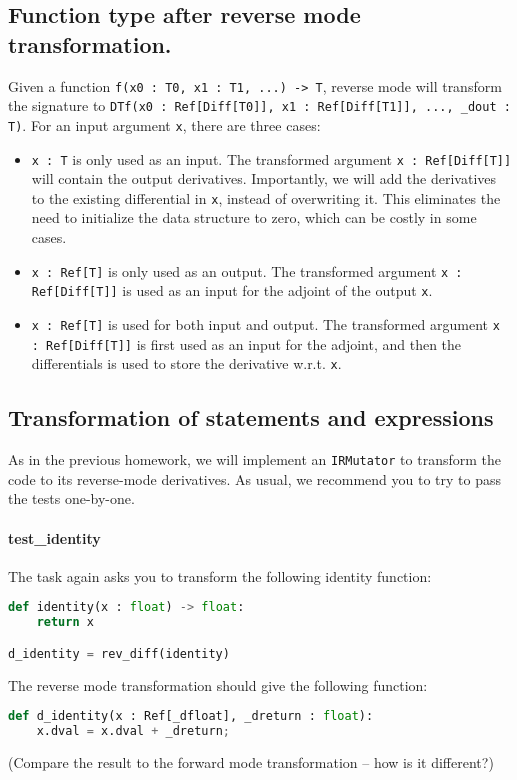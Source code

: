\subsection{Function type after reverse mode transformation.}
\label{sec:reversemodespec}

Given a function \lstinline{f(x0 : T0, x1 : T1, ...) -> T}, reverse mode will transform the signature to \lstinline{DTf(x0 : Ref[Diff[T0]], x1 : Ref[Diff[T1]], ..., _dout : T)}. For an input argument \lstinline{x}, there are three cases:
\begin{itemize}
	\item \lstinline{x : T} is only used as an input. The transformed argument \lstinline{x : Ref[Diff[T]]} will contain the output derivatives. Importantly, we will add the derivatives to the existing differential in \lstinline{x}, instead of overwriting it. This eliminates the need to initialize the data structure to zero, which can be costly in some cases.
	\item \lstinline{x : Ref[T]} is only used as an output. The transformed argument \lstinline{x : Ref[Diff[T]]} is used as an input for the adjoint of the output \lstinline{x}.
	\item \lstinline{x : Ref[T]} is used for both input and output. The transformed argument \lstinline{x : Ref[Diff[T]]} is first used as an input for the adjoint, and then the differentials is used to store the derivative w.r.t. \lstinline{x}.
\end{itemize}

\subsection{Transformation of statements and expressions}
As in the previous homework, we will implement an \lstinline{IRMutator} to transform the code to its reverse-mode derivatives. As usual, we recommend you to try to pass the tests one-by-one. 

\paragraph{test_identity} The task again asks you to transform the following identity function:
\begin{lstlisting}[language=Python]
def identity(x : float) -> float:
    return x

d_identity = rev_diff(identity)
\end{lstlisting}
The reverse mode transformation should give the following function:
\begin{lstlisting}[language=Python]
def d_identity(x : Ref[_dfloat], _dreturn : float):
	x.dval = x.dval + _dreturn;
\end{lstlisting}
(Compare the result to the forward mode transformation -- how is it different?)

